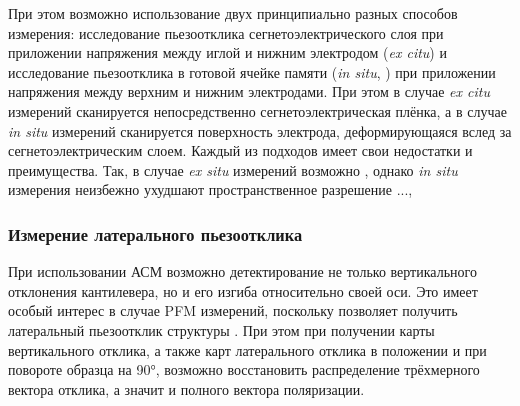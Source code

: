 При этом возможно использование двух принципиально разных способов измерения: исследование пьезоотклика сегнетоэлектрического слоя при приложении напряжения между иглой и нижним электродом (\textit{ex citu}) и исследование пьезоотклика в готовой ячейке памяти (\textit{in situ}, ) при приложении напряжения между верхним и нижним электродами. При этом в случае \textit{ex citu} измерений сканируется непосредственно сегнетоэлектрическая плёнка, а в случае \textit{in situ} измерений сканируется поверхность электрода, деформирующаяся вслед за сегнетоэлектрическим слоем. Каждый из подходов имеет свои недостатки и преимущества. Так, в случае \textit{ex situ} измерений возможно , однако \textit{in situ} измерения неизбежно ухудшают пространственное разрешение ...,



\subsubsection{Измерение латерального пьезоотклика}
При использовании АСМ возможно детектирование не только вертикального отклонения кантилевера, но и его изгиба относительно своей оси. Это имеет особый интерес в случае PFM измерений, поскольку позволяет получить латеральный пьезоотклик структуры . При этом при получении карты вертикального отклика, а также карт латерального отклика в  положении и при повороте образца на \ang{90}, возможно восстановить распределение трёхмерного вектора отклика, а значит и полного вектора поляризации. 

